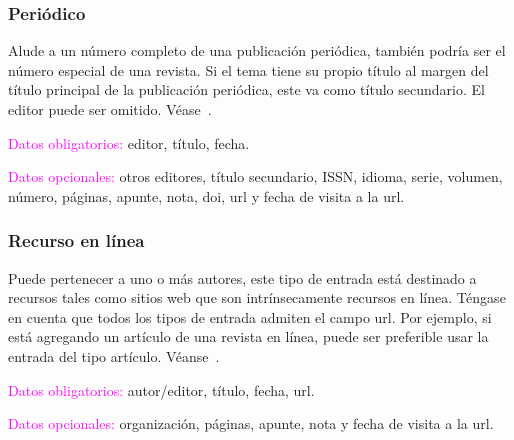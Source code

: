 \documentclass{book}
\begin{document}
{{{{{{{{{{{{{{{{{\subsubsection{Periódico}

Alude a un número completo de una publicación periódica, también podría ser el número especial de una revista. Si el tema tiene su propio título al margen del título principal de la publicación periódica, este va como título secundario. El editor puede ser omitido. Véase~\textcite{periodicojcg}.

\begin{compactdesc}
\item [\textcolor{magenta}{Datos obligatorios:}]  editor, título, fecha.
\item [\textcolor{magenta}{Datos opcionales:}] otros editores, título secundario, ISSN, idioma, serie, volumen, número, páginas, apunte, nota, doi, url y fecha de visita a la url.
\end{compactdesc}

\begin{mdframed}[linewidth=.5pt,linecolor=black!30,roundcorner=3pt,backgroundcolor=yellow!15]
\noindent\vspace{-12pt}
\printbibliography[keyword=periodico,heading=none]
\end{mdframed}

\subsubsection{Recurso en línea}

Puede pertenecer a uno o más autores, este tipo de entrada está destinado a recursos tales como sitios web que son intrínsecamente recursos en línea. Téngase en cuenta que todos los tipos de entrada admiten el campo url. Por ejemplo, si está agregando un artículo de una revista en línea, puede ser preferible usar la entrada del tipo artículo. Véanse~\textcite{Brysk1994A,onlinedemo}.

\begin{compactdesc}
\item [\textcolor{magenta}{Datos obligatorios:}] autor/editor, título, fecha, url.
\item [\textcolor{magenta}{Datos opcionales:}] organización, páginas, apunte, nota y fecha de visita a la url.
\end{compactdesc}

\begin{mdframed}[linewidth=.5pt,linecolor=black!30,roundcorner=3pt,backgroundcolor=yellow!15]
\noindent\vspace{-12pt}
\printbibliography[keyword=online,heading=none]
\end{mdframed}

}}}}}}}}}}}}}}}}}
\end{document}
